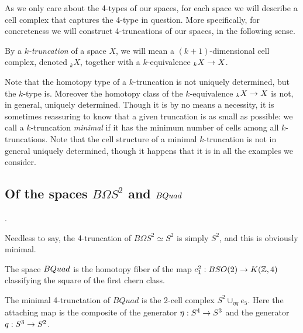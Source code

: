 \documentclass{amsart}
\begin{document}
As we only care about the 4-types of our spaces, for each space we will describe a cell complex that captures the 4-type in question.  More specifically, for concreteness we will construct 4-truncations of our spaces, in the following sense.

\begin{definition}
By a \emph{$k$-truncation} of a space $X$, we will mean a $(k+1)$-dimensional cell complex, denoted $_k X$, together with a $k$-equivalence $_{k} X \rightarrow X$.
\end{definition}
\nid Note that the homotopy type of a $k$-truncation is not uniquely determined, but the $k$-type is.  Moreover the homotopy class of the $k$-equivalence $_k X \rightarrow X$ is not, in general, uniquely determined.  Though it is by no means a necessity, it is sometimes reassuring to know that a given truncation is as small as possible: we call a $k$-truncation \emph{minimal} if it has the minimum number of cells among all $k$-truncations.  Note that the cell structure of a minimal $k$-truncation is not in general uniquely determined, though it happens that it is in all the examples we consider.


\subsection{Of the spaces $B\Omega S^2$ and $BQuad$}.

Needless to say, the 4-truncation of $B\Omega S^2 \simeq S^2$ is simply $S^2$, and this is obviously minimal.

\begin{definition}
The space $BQuad$ is the homotopy fiber of the map $c_1^2: BSO(2) \rightarrow K(\mathbb Z,4)$ classifying the square of the first chern class.
\end{definition}


\begin{proposition} \label{prop-quadtrunc}
The minimal 4-trunctation of $BQuad$ is the 2-cell complex $S^2 \cup_{\eta q} e_5$.  Here the attaching map is the composite of the generator $\eta: S^4 \rightarrow S^3$ and the generator $q: S^3 \rightarrow S^2$.
\end{proposition}
\end{document}
